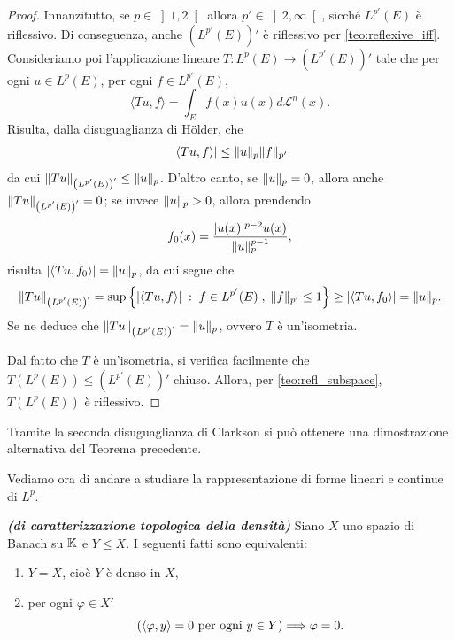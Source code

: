 \begin{proof}
	Innanzitutto, se $p \in \left]  1, 2 \right[ $ allora $p' \in \left]  2, \infty \right[$, sicché $L^{p'}(E)$ è riflessivo. Di conseguenza, anche $\left( L^{p'}(E)\right)'$ è riflessivo per \eqref{teo:reflexive_iff}. Consideriamo poi l'applicazione lineare $T : L^{p}(E) \to \left( L^{p'}(E)\right)' $ tale che per ogni $u \in L^{p}(E) $, per ogni $f \in L^{p'}(E)$,
	\[ \langle Tu,f\rangle = \int_{E}^{} f(x)u(x)d\mathcal{L}^{n}(x).\]
	Risulta, dalla disuguaglianza di H\"older, che
	\[ \lvert\langle Tu,f\rangle\rvert \le \lVert u\rVert_{p}\lVert f\rVert_{p'} \]
	da cui $\lVert Tu\rVert_{\left( L^{p'}(E)\right)'} \le \lVert u\rVert_{p}$. D'altro canto, se $\lVert u\rVert_{p}=0$, allora anche $\lVert Tu\rVert_{\left( L^{p'}(E)\right)'} = 0$; se invece $\lVert u\rVert_{p}>0$, allora prendendo 
	\[ f_{0}(x) = \frac{\lvert u(x)\rvert^{p-2}u(x)}{\lVert u\rVert^{p-1}_{p}}, \]
	risulta $\lvert\langle Tu,f_{0}\rangle\rvert = \lVert u\rVert_{p}$, da cui segue che
	\[ \lVert Tu\rVert_{\left( L^{p'}(E)\right)'} = \sup\left\lbrace \lvert\langle Tu,f\rangle\rvert \; :\; f \in L^{p'}(E) \;,\; \lVert f\rVert_{p'} \le 1\right\rbrace \ge \lvert\langle Tu,f_{0}\rangle\rvert = \lVert u\rVert_{p}. \]
	Se ne deduce che $\lVert Tu\rVert_{\left( L^{p'}(E)\right)'} = \lVert u\rVert_{p} $, ovvero $T$ è un'isometria. %
	
	Dal fatto che $T$ è un'isometria, si verifica facilmente che $T(L^{p}(E)) \le \left( L^{p'}(E)\right)'$ chiuso. Allora, per \eqref{teo:refl_subspace}, $T(L^{p}(E))$ è riflessivo. 
\end{proof}
\begin{osservazione}
	Tramite la seconda disuguaglianza di Clarkson si può ottenere una dimostrazione alternativa del Teorema precedente.
\end{osservazione}

Vediamo ora di andare a studiare la rappresentazione di forme lineari e continue di $L^p$.
\begin{lemma}\emph{\textbf{(di caratterizzazione topologica della densità)}}
	Siano $X$ uno spazio di Banach su $\mathbb{K}$ e $Y \le X$. I seguenti fatti sono equivalenti:
	\begin{enumerate}[$(a)$]
		\item $\overline{Y} = X$, cioè $Y$ è denso in $X$, 
		\item per ogni $\varphi \in X'$
		\[  \left( \langle \varphi, y \rangle = 0 \textup{ per ogni } y \in Y\right) \Longrightarrow \varphi = 0.\]
	\end{enumerate}
\end{lemma}

